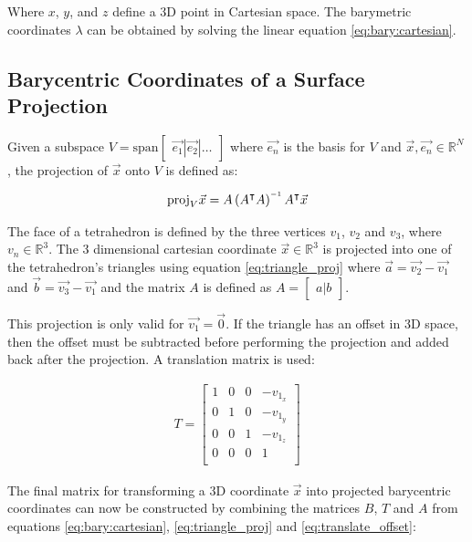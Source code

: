 Where  $x$,  $y$, and $z$ define a 3D point in Cartesian space.  The  barymetric
coordinates  $\lambda$   can   be   obtained  by  solving  the  linear  equation
\ref{eq:bary:cartesian}.

\subsection{Barycentric Coordinates of a Surface Projection}

Given a subspace $V = \text{span} \begin{bmatrix} \vec{e_1} | \vec{e_2} | \ldots
\end{bmatrix}$ where $\vec{e_n}$ is the basis for $V$  and  $\vec{x} , \vec{e_n}
\in  \mathbb{R}^N$,  the  projection  of  $\vec{x}$  onto  $V$  is  defined  as:

\begin{align}
    \label{eq:triangle_proj}
    \text{proj}_V\vec{x} = A\left(A\transpose A\right)\inverse A\transpose\vec{x}
\end{align}

The face of a  tetrahedron  is  defined  by  the three vertices $v_1$, $v_2$ and
$v_3$,  where  $v_n \in \mathbb{R}^3$. The 3  dimensional  cartesian  coordinate
$\vec{x}\in\mathbb{R}^3$  is  projected  into one of the tetrahedron's triangles
using equation \ref{eq:triangle_proj} where $\vec{a}  =  \vec{v_2}  - \vec{v_1}$
and  $\vec{b} = \vec{v_3}  -  \vec{v_1}$  and  the  matrix  $A$  is  defined  as
$A=\begin{bmatrix} a|b \end{bmatrix}$.

This projection is only valid for $\vec{v_1} = \vec{0}$.  If the triangle has an
offset in 3D space,  then  the  offset  must be subtracted before performing the
projection and added back after the projection. A translation matrix is used:

\begin{align}
    \label{eq:translate_offset}
    T = \begin{bmatrix}
        1 & 0 & 0 & -v_{1_x} \\
        0 & 1 & 0 & -v_{1_y} \\
        0 & 0 & 1 & -v_{1_z} \\
        0 & 0 & 0 & 1 \\
    \end{bmatrix}
\end{align}

The final matrix for transforming  a  3D  coordinate  $\vec{x}$  into  projected
barycentric coordinates can now be constructed  by  combining  the matrices $B$,
$T$ and $A$ from  equations  \ref{eq:bary:cartesian}, \ref{eq:triangle_proj} and
\ref{eq:translate_offset}:

